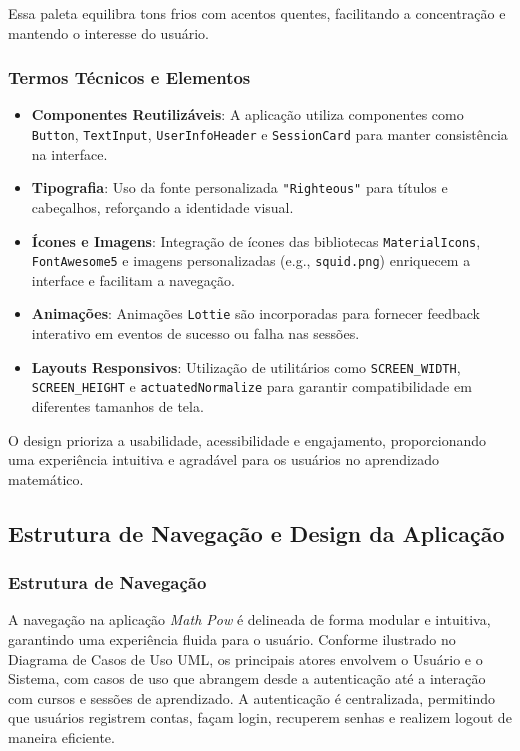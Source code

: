 Essa paleta equilibra tons frios com acentos quentes, facilitando a concentração e mantendo o interesse do usuário.


\subsubsection{Termos Técnicos e Elementos}

\begin{itemize}
    \item \textbf{Componentes Reutilizáveis}: A aplicação utiliza componentes como \texttt{Button}, \texttt{TextInput}, \texttt{UserInfoHeader} e \texttt{SessionCard} para manter consistência na interface.
    \item \textbf{Tipografia}: Uso da fonte personalizada \texttt{"Righteous"} para títulos e cabeçalhos, reforçando a identidade visual.
    \item \textbf{Ícones e Imagens}: Integração de ícones das bibliotecas \texttt{MaterialIcons}, \texttt{FontAwesome5} e imagens personalizadas (e.g., \texttt{squid.png}) enriquecem a interface e facilitam a navegação.
    \item \textbf{Animações}: Animações \texttt{Lottie} são incorporadas para fornecer feedback interativo em eventos de sucesso ou falha nas sessões.
    \item \textbf{Layouts Responsivos}: Utilização de utilitários como \texttt{SCREEN\_WIDTH}, \texttt{SCREEN\_HEIGHT} e \texttt{actuatedNormalize} para garantir compatibilidade em diferentes tamanhos de tela.
\end{itemize}

O design prioriza a usabilidade, acessibilidade e engajamento, proporcionando uma experiência intuitiva e agradável para os usuários no aprendizado matemático.

\subsection{Estrutura de Navegação e Design da Aplicação}

\subsubsection{Estrutura de Navegação}

A navegação na aplicação \textit{Math Pow} é delineada de forma modular e intuitiva, garantindo uma experiência fluida para o usuário. Conforme ilustrado no Diagrama de Casos de Uso UML, os principais atores envolvem o Usuário e o Sistema, com casos de uso que abrangem desde a autenticação até a interação com cursos e sessões de aprendizado. A autenticação é centralizada, permitindo que usuários registrem contas, façam login, recuperem senhas e realizem logout de maneira eficiente.

